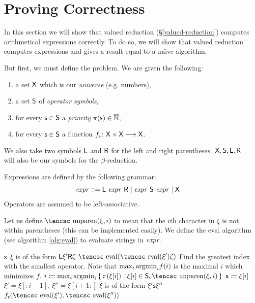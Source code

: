 \documentclass{llncs}
\newcounter{algo}
\begin{document}
\section{Proving Correctness}

\def\eval{\hbox{\tencsc eval}}
\def\unparen{\hbox{\tencsc unparen}}

In this section we will show that valued reduction (\S\ref{valued-reduction}) computes arithmetical expressions correctly.
To do so, we will show that valued reduction computes expressions and gives a result equal to a na\"\i ve algorithm.

But first, we must define the problem.
We are given the following:
\begin{enumerate}
    \item a set $\mathsf{X}$ which is our \textit{universe} (e.g. numbers),
    \item a set $\mathsf{S}$ of \textit{operator symbols},
    \item for every $\mathsf{s}\in\mathsf{S}$ a \textit{priority} $\pi(\mathsf{s})\in\overline{\mathbb N}$,
    \item for every $\mathsf{s}\in\mathsf{S}$ a function $f_{\mathsf{s}}\colon\mathsf{X}\times\mathsf{X}\longrightarrow\mathsf{X}$.
\end{enumerate}
We also take two symbols $\mathsf{L}$ and $\mathsf{R}$ for the left and right parentheses.
$\mathsf{X},\mathsf{S},\mathsf{L},\mathsf{R}$ will also be our symbols for the $\beta$-reduction.

Expressions are defined by the following grammar:
\[ {\it expr} \mathrel{{\mathop:}{\mathop:}{=}} \mathsf{L}\ {\it expr}\ \mathsf{R}  \mid {\it expr}\ \mathsf{S}\ {\it expr} \mid \mathsf{X} \]
Operators are assumed to be left-associative.

Let us define $\unparen(\xi,i)$ to mean that the $i$th character in $\xi$ is not within parentheses (this can be implemented easily).
We define the \eval{} algorithm (see algorithm \ref{alg:eval}) to evaluate strings in ${\it expr}$.

\begin{algo}
\algorithm
{}
        \State\Return $\mathsf{x}$
        \State $\xi$ is of the form $\mathsf{L}\xi'\mathsf{R}\zeta$
        \State\Return $\eval(\eval(\xi')\zeta)$
    \Else
        \Comment Find the greatest index with the smallest operator.\cr
        Note that $\max_i{\rm argmin}_if(i)$ is the maximal $i$ which minimizes $f$.\EndComment
        \State $i\coloneqq\max_i{\rm argmin}_i\set{\pi(\xi[i])}[{\xi[i]\in\s S,\unparen(\xi,i)}]$
        \State $\mathsf{s}\coloneqq\xi[i]$
        \Comment $\xi'=\xi[:i-1]$, $\xi''=\xi[i+1:]$ \EndComment
        \State $\xi$ is of the form $\xi'\mathsf{s}\xi''$
        \State\Return $f_{\s s}(\eval(\xi'),\eval(\xi''))$
    \EndIf
\EndFunc
\ealgorithm
\caption{\eval uating arithmetical expressions}
\label{alg:eval}
\end{algo}
\end{document}

